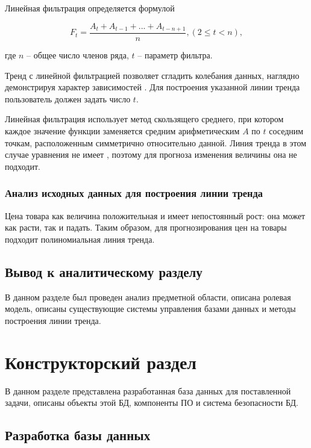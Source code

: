 \documentclass{bmstu}
\begin{document}
Линейная фильтрация определяется формулой

\begin{equation}
	F_t = \frac{A_t + A_{t-1} + ... + A_{t-n+1}}{n}, (2 \leqslant t < n),
\end{equation}

где $n$ -- общее число членов ряда, $t$ -- параметр фильтра.

Тренд с линейной фильтрацией позволяет сгладить колебания данных, наглядно демонстрируя характер зависимостей \cite{lt-exel}. Для построения указанной линии тренда пользователь должен задать число $t$.

Линейная фильтрация использует метод скользящего среднего, при котором каждое значение функции заменяется средним арифметическим $A$ по $t$ соседним точкам, расположенным симметрично относительно данной. Линия тренда в этом случае уравнения не имеет \cite{lin-filt}, поэтому для прогноза изменения величины она не подходит.

\subsection{Анализ исходных данных для построения линии тренда}

Цена товара как величина положительная и имеет непостоянный рост: она может как расти, так и падать. Таким образом, для прогнозирования цен на товары подходит полиномиальная линия тренда.

\section*{Вывод к аналитическому разделу}

В данном разделе был проведен анализ предметной области, описана ролевая модель, описаны существующие системы управления базами данных и методы построения линии тренда.

\chapter{Конструкторский раздел}

В данном разделе представлена разработанная база данных для поставленной задачи, описаны объекты этой БД, компоненты ПО и система безопасности БД.

\section{Разработка базы данных}
\end{document}
